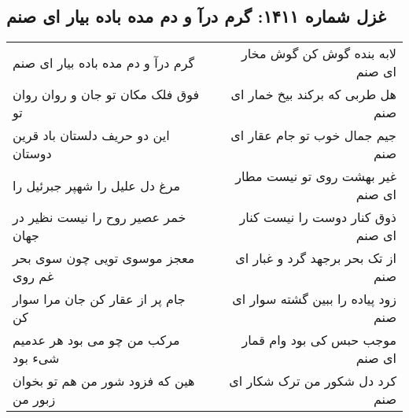 \begin{center}
\section*{غزل شماره ۱۴۱۱: گرم درآ و دم مده باده بیار ای صنم}
\label{sec:1411}
\begin{longtable}{l p{0.5cm} r}
گرم درآ و دم مده باده بیار ای صنم
&&
لابه بنده گوش کن گوش مخار ای صنم
\\
فوق فلک مکان تو جان و روان روان تو
&&
هل طربی که برکند بیخ خمار ای صنم
\\
این دو حریف دلستان باد قرین دوستان
&&
جیم جمال خوب تو جام عقار ای صنم
\\
مرغ دل علیل را شهپر جبرئیل را
&&
غیر بهشت روی تو نیست مطار ای صنم
\\
خمر عصیر روح را نیست نظیر در جهان
&&
ذوق کنار دوست را نیست کنار ای صنم
\\
معجز موسوی تویی چون سوی بحر غم روی
&&
از تک بحر برجهد گرد و غبار ای صنم
\\
جام پر از عقار کن جان مرا سوار کن
&&
زود پیاده را ببین گشته سوار ای صنم
\\
مرکب من چو می بود هر عدمیم شیء بود
&&
موجب حبس کی بود وام قمار ای صنم
\\
هین که فزود شور من هم تو بخوان زبور من
&&
کرد دل شکور من ترک شکار ای صنم
\\
\end{longtable}
\end{center}
